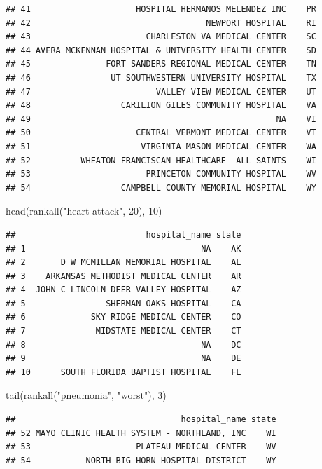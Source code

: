 \documentclass[
]{book}
\newenvironment{Shaded}{\begin{snugshade}}{\end{snugshade}}
\newcommand{\DecValTok}[1]{\textcolor[rgb]{0.00,0.00,0.81}{#1}}
\newcommand{\FunctionTok}[1]{\textcolor[rgb]{0.00,0.00,0.00}{#1}}
\newcommand{\NormalTok}[1]{#1}
\newcommand{\StringTok}[1]{\textcolor[rgb]{0.31,0.60,0.02}{#1}}
\theoremstyle{definition}
\theoremstyle{definition}
\theoremstyle{definition}
\theoremstyle{definition}
\theoremstyle{remark}
\begin{document}
\begin{verbatim}
## 41                     HOSPITAL HERMANOS MELENDEZ INC    PR
## 42                                   NEWPORT HOSPITAL    RI
## 43                       CHARLESTON VA MEDICAL CENTER    SC
## 44 AVERA MCKENNAN HOSPITAL & UNIVERSITY HEALTH CENTER    SD
## 45               FORT SANDERS REGIONAL MEDICAL CENTER    TN
## 46                UT SOUTHWESTERN UNIVERSITY HOSPITAL    TX
## 47                         VALLEY VIEW MEDICAL CENTER    UT
## 48                  CARILION GILES COMMUNITY HOSPITAL    VA
## 49                                                 NA    VI
## 50                     CENTRAL VERMONT MEDICAL CENTER    VT
## 51                      VIRGINIA MASON MEDICAL CENTER    WA
## 52          WHEATON FRANCISCAN HEALTHCARE- ALL SAINTS    WI
## 53                       PRINCETON COMMUNITY HOSPITAL    WV
## 54                  CAMPBELL COUNTY MEMORIAL HOSPITAL    WY
\end{verbatim}

\begin{Shaded}
\begin{Highlighting}[]
\FunctionTok{head}\NormalTok{(}\FunctionTok{rankall}\NormalTok{(}\StringTok{"heart attack"}\NormalTok{, }\DecValTok{20}\NormalTok{), }\DecValTok{10}\NormalTok{)}
\end{Highlighting}
\end{Shaded}

\begin{verbatim}
##                          hospital_name state
## 1                                   NA    AK
## 2       D W MCMILLAN MEMORIAL HOSPITAL    AL
## 3    ARKANSAS METHODIST MEDICAL CENTER    AR
## 4  JOHN C LINCOLN DEER VALLEY HOSPITAL    AZ
## 5                SHERMAN OAKS HOSPITAL    CA
## 6             SKY RIDGE MEDICAL CENTER    CO
## 7              MIDSTATE MEDICAL CENTER    CT
## 8                                   NA    DC
## 9                                   NA    DE
## 10      SOUTH FLORIDA BAPTIST HOSPITAL    FL
\end{verbatim}

\begin{Shaded}
\begin{Highlighting}[]
\FunctionTok{tail}\NormalTok{(}\FunctionTok{rankall}\NormalTok{(}\StringTok{"pneumonia"}\NormalTok{, }\StringTok{"worst"}\NormalTok{), }\DecValTok{3}\NormalTok{)}
\end{Highlighting}
\end{Shaded}

\begin{verbatim}
##                                 hospital_name state
## 52 MAYO CLINIC HEALTH SYSTEM - NORTHLAND, INC    WI
## 53                     PLATEAU MEDICAL CENTER    WV
## 54           NORTH BIG HORN HOSPITAL DISTRICT    WY
\end{verbatim}
\end{document}
